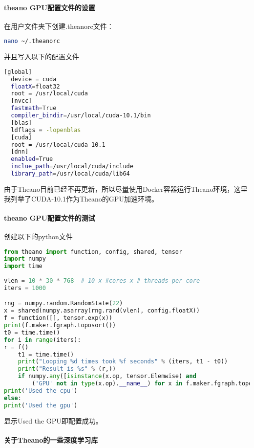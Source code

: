 \documentclass[lang=cn,a4paper,newtx]{elegantpaper}
\begin{document}
\paragraph{theano GPU配置文件的设置}

在用户文件夹下创建.theanorc文件：
\begin{lstlisting}[language=bash]
  nano ~/.theanorc
\end{lstlisting}

并且写入以下的配置文件
\begin{lstlisting}[language=bash]
  [global]
  device = cuda
  floatX=float32
  root = /usr/local/cuda
  [nvcc]
  fastmath=True
  compiler_bindir=/usr/local/cuda-10.1/bin
  [blas]
  ldflags = -lopenblas
  [cuda]
  root = /usr/local/cuda-10.1
  [dnn]
  enabled=True
  inclue_path=/usr/local/cuda/include
  library_path=/usr/local/cuda/lib64
\end{lstlisting}

由于Theano目前已经不再更新，所以尽量使用Docker容器运行Theano环境，这里我列举了CUDA-10.1作为Theano的GPU加速环境。

\paragraph{theano GPU配置文件的测试}

创建以下的python文件
\begin{lstlisting}[language=python]
from theano import function, config, shared, tensor
import numpy
import time
            
vlen = 10 * 30 * 768  # 10 x #cores x # threads per core
iters = 1000

rng = numpy.random.RandomState(22)
x = shared(numpy.asarray(rng.rand(vlen), config.floatX))
f = function([], tensor.exp(x))
print(f.maker.fgraph.toposort())
t0 = time.time()
for i in range(iters):
r = f()
    t1 = time.time()
    print("Looping %d times took %f seconds" % (iters, t1 - t0))
    print("Result is %s" % (r,))
    if numpy.any([isinstance(x.op, tensor.Elemwise) and
    	('GPU' not in type(x.op).__name__) for x in f.maker.fgraph.toposort()]):
print('Used the cpu')
else:
print('Used the gpu')
\end{lstlisting}

显示Used the GPU即配置成功。

\paragraph{关于Theano的一些深度学习库}
\end{document}
